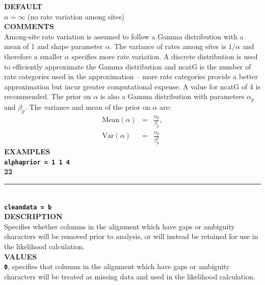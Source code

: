\documentclass{book}
\numberwithin{equation}{section} \renewcommand{\baselinestretch}{0.55}
\begin{document}
\textbf{DEFAULT} \vspace{5pt}\\
$\alpha=\infty$ (no rate variation among sites) \vspace{5pt}\\
\textbf{COMMENTS} \vspace{5pt}\\
Among-site rate variation is assumed to follow a Gamma distribution
with a mean of 1 and shape parameter $\alpha$. The variance of rates
among sites is $1/\alpha$ and therefore a smaller $\alpha$ specifies
more rate variation.  A discrete distribution is used to efficiently
approximate the Gamma distribution and ncatG is the number of rate
categories used in the approximation -- more rate categories provide a
better approximation but incur greater computational expense. A value
for ncatG of 4 is recommended. The prior on $\alpha$ is also a Gamma
distribution with parameters $\alpha_p$ and $\beta_p$.  The variance
and mean of the prior on $\alpha$ are:
\begin{eqnarray}
  \textrm{Mean}(\alpha) & = & \frac{\alpha_p}{\beta_p}, \nonumber \\
  \textrm{Var}(\alpha) & = & \frac{\alpha_p}{\beta_p^2} \nonumber
\end{eqnarray}
\textbf{EXAMPLES} \vspace{5pt}\\
\textbf{\texttt{alphaprior = 1 1 4}} \vspace{10pt}\\
\textbf{{\large 22}} \\
\noindent\rule{\textwidth}{0.8pt} \\
\textbf{{\Large \texttt{cleandata = b}}} \vspace{5pt}\\
\textbf{DESCRIPTION} \vspace{5pt}\\
Specifies whether columns in the alignment which have gaps or
ambiguity characters will be removed prior to analysis, or will
instead be retained for use in the likelihood calculation.
\vspace{5pt}\\
\textbf{VALUES} \vspace{5pt}\\
\textbf{\texttt{0}}, specifies that columns in the alignment which
have gaps or ambiguity
characters will be treated as missing data and used in the likelihood calculation. \vspace{5pt}\\
\end{document}
